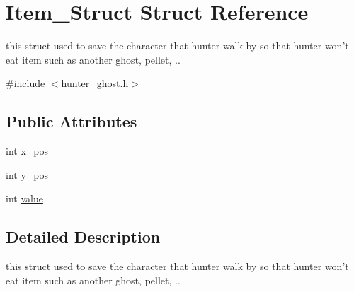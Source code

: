 \hypertarget{structItem__Struct}{\section{Item\-\_\-\-Struct Struct Reference}
\label{structItem__Struct}
}


this struct used to save the character that hunter walk by so that hunter won't eat item such as another ghost, pellet, ..  




{\ttfamily \#include $<$hunter\-\_\-ghost.\-h$>$}

\subsection*{Public Attributes}
\begin{DoxyCompactItemize}
\item 
int \hyperlink{structItem__Struct_adcf51b98fbd8837636ba17f1d7a88e6a}{x\-\_\-pos}
\item 
int \hyperlink{structItem__Struct_a108413444c2b584ccf9e659820e68d40}{y\-\_\-pos}
\item 
int \hyperlink{structItem__Struct_ac0e3895647b53fea3e43aef68b044e42}{value}
\end{DoxyCompactItemize}


\subsection{Detailed Description}
this struct used to save the character that hunter walk by so that hunter won't eat item such as another ghost, pellet, .. 

